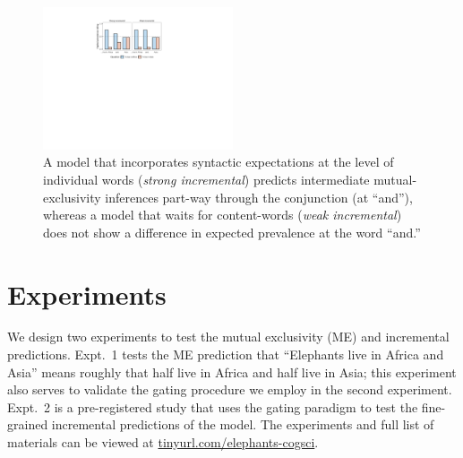 \documentclass[10pt,letterpaper]{article}
\providecommand{\tightlist}{%
  \setlength{\itemsep}{0pt}\setlength{\parskip}{0pt}}
\newcommand{\denote}[1]{\mbox{ $[\![ #1 ]\!]$}}
\begin{document}
\begin{figure}[t]
  \centering
    \includegraphics[width=0.5\textwidth]{incremental}
    \vspace{-0.8cm}
  \caption{A model that incorporates syntactic expectations at the level of individual words (\emph{strong incremental}) predicts intermediate mutual-exclusivity inferences part-way through the conjunction (at ``and''), whereas a model that waits for content-words (\emph{weak incremental}) does not show a difference in expected prevalence at the word ``and.''
  }
          \vspace{-0.5cm}
  \label{fig:incremental}
\end{figure}


%


\section{Experiments}

We design two experiments to test the mutual exclusivity (ME) and incremental predictions.
Expt.~1 tests the ME prediction that ``Elephants live in Africa and Asia'' means roughly that half live in Africa and half live in Asia; this experiment also serves to validate the gating procedure we employ in the second experiment. 
Expt.~2 is a pre-registered study that uses the gating paradigm to test the fine-grained incremental predictions of the model.
The experiments and full list of materials can be viewed at \url{tinyurl.com/elephants-cogsci}.
\end{document}
